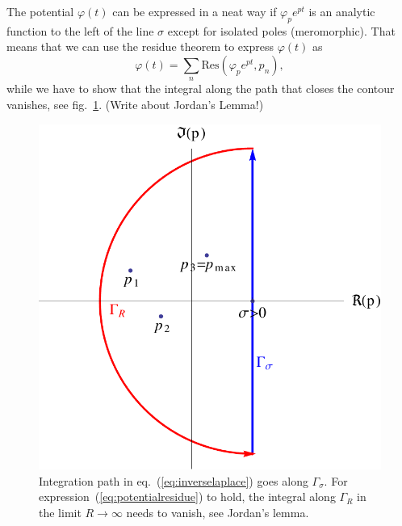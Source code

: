 \documentclass[physics,phd,nolot,nolof]{uccthesis}%
\begin{document}
The potential $\varphi(t)$ can be expressed in a neat way if $\varphi_p e^{pt}$ is an analytic function to the left of the line $\sigma$ except for isolated poles (meromorphic).
That means that we can use the residue theorem to express $\varphi(t)$ as
\begin{equation}
	\varphi(t)=\sum_n \text{Res}\left(\varphi_p e^{pt},p_n\right),
	\label{eq:potentialresidue}
\end{equation}
while we have to show that the integral along the path that closes the contour vanishes, see fig.~\ref{fig:jordan}. (Write about Jordan's Lemma!)
\begin{figure}[h]
	\begin{center}
	\includegraphics[width=.75\textwidth]{Jordan.pdf}
	\end{center}
	\caption{Integration path in eq.~(\ref{eq:inverselaplace}) goes along $\Gamma_\sigma$. For expression~(\ref{eq:potentialresidue}) to hold, the integral along $\Gamma_R$ in the limit $R\rightarrow\infty$ needs to vanish, see Jordan's lemma.}
	\label{fig:jordan}
\end{figure}
\end{document}
